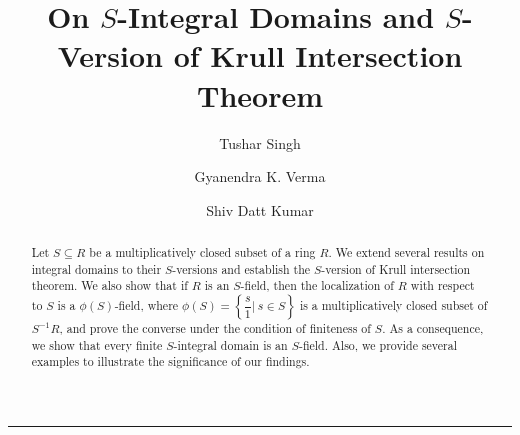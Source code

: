 \documentclass[11pt]{article}
\begin{document}
	\newtheorem{theorem}{Theorem}[section]
	\newtheorem{question}{Question}[section]
	\newtheorem{thm}[theorem]{Theorem}
	\newtheorem{lem}[theorem]{Lemma}
	\newtheorem{eg}[theorem]{Example}
	\newtheorem{prop}[theorem]{Proposition}
	\newtheorem{cor}[theorem]{Corollary}
	\newtheorem{rem}[theorem]{Remark}
	\newtheorem{deff}[theorem]{Definition}
	\title{On $S$-Integral Domains and $S$-Version of Krull Intersection Theorem}
	
	\author[1]{Tushar Singh}
	\author[2]{Gyanendra K. Verma}
	\author[3]{Shiv Datt Kumar }
	
	
	\vskip0.05in
	\maketitle
	\hrule
	\begin{abstract}
		\noindent
		 Let $S\subseteq R$ be a multiplicatively closed subset of a ring $R$.  We extend several results on integral domains to their $S$-versions and establish the $S$-version of Krull intersection theorem. We also show that if $R$ is an $S$-field, then the localization of $R$ with respect to $S$ is a $\phi(S)$-field, where $\phi(S)=\left \{\dfrac{s}{1}| \ s\in S\right \}$ is a multiplicatively closed subset of $S^{-1}R$, and prove the converse under the condition of finiteness of $S$. As a consequence, we show that every finite $S$-integral domain is an $S$-field. Also, we provide several examples to illustrate the significance of our findings. 
		
	\end{abstract}
\end{document}
